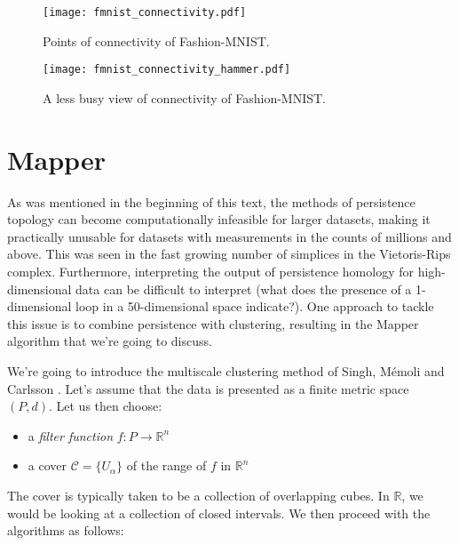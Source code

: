 \begin{figure}[h!]
  \centering
  \texttt{[image: fmnist\_connectivity.pdf]}
  \caption{Points of connectivity of Fashion-MNIST.}
  \label{fig:fmnist_connectivity}
\end{figure}

\begin{figure}[h!]
  \centering
  \texttt{[image: fmnist\_connectivity\_hammer.pdf]}
  \caption{A less busy view of connectivity of Fashion-MNIST.}
  \label{fig:fmnist_connectivity_hammer}
\end{figure}

\section{Mapper}
As was mentioned in the beginning of this text, the methods of persistence topology can become computationally infeasible for larger datasets, making it practically unusable for datasets with measurements in the counts of millions and above. This was seen in the fast growing number of simplices in the Vietoris-Rips complex. Furthermore, interpreting the output of persistence homology for high-dimensional data can be difficult to interpret (what does the presence of a 1-dimensional loop in a 50-dimensional space indicate?). One approach to tackle this issue is to combine persistence with clustering, resulting in the Mapper algorithm that we're going to discuss.

We're going to introduce the multiscale clustering method of Singh, Mémoli and Carlsson \cite{singh2007topological}. Let's assume that the data is presented as a finite metric space $(P, d)$. Let us then choose:

\begin{itemize}
  \item a \textit{filter function} $f: P \to \mathbb{R}^{n}$
  \item a cover $\mathcal{C} = \{U_{\alpha}\}$ of the range of $f$ in $\mathbb{R}^{n}$
\end{itemize}
The cover is typically taken to be a collection of overlapping cubes. In $\mathbb{R}$, we would be looking at a collection of closed intervals. We then proceed with the algorithms as follows:

